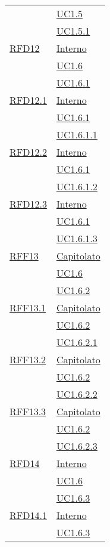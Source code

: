 \begin{longtable}{|>{\centering}m{5cm}|m{5cm}<{\centering}|}
& \hyperref[UC1.5]{UC1.5}\\
& \hyperref[UC1.5.1]{UC1.5.1}\\ \hline
\hyperlink{RFD12}{RFD12} & \hyperlink{Interno}{Interno}\\
& \hyperref[UC1.6]{UC1.6}\\
& \hyperref[UC1.6.1]{UC1.6.1}\\ \hline
\hyperlink{RFD12.1}{RFD12.1} & \hyperlink{Interno}{Interno}\\
& \hyperref[UC1.6.1]{UC1.6.1}\\
& \hyperref[UC1.6.1.1]{UC1.6.1.1}\\ \hline
\hyperlink{RFD12.2}{RFD12.2} & \hyperlink{Interno}{Interno}\\
& \hyperref[UC1.6.1]{UC1.6.1}\\
& \hyperref[UC1.6.1.2]{UC1.6.1.2}\\ \hline
\hyperlink{RFD12.3}{RFD12.3} & \hyperlink{Interno}{Interno}\\
& \hyperref[UC1.6.1]{UC1.6.1}\\
& \hyperref[UC1.6.1.3]{UC1.6.1.3}\\ \hline
\hyperlink{RFF13}{RFF13} & \hyperlink{Capitolato}{Capitolato}\\
& \hyperref[UC1.6]{UC1.6}\\
& \hyperref[UC1.6.2]{UC1.6.2}\\ \hline
\hyperlink{RFF13.1}{RFF13.1} & \hyperlink{Capitolato}{Capitolato}\\
& \hyperref[UC1.6.2]{UC1.6.2}\\
& \hyperref[UC1.6.2.1]{UC1.6.2.1}\\ \hline
\hyperlink{RFF13.2}{RFF13.2} & \hyperlink{Capitolato}{Capitolato}\\
& \hyperref[UC1.6.2]{UC1.6.2}\\
& \hyperref[UC1.6.2.2]{UC1.6.2.2}\\ \hline
\hyperlink{RFF13.3}{RFF13.3} & \hyperlink{Capitolato}{Capitolato}\\
& \hyperref[UC1.6.2]{UC1.6.2}\\
& \hyperref[UC1.6.2.3]{UC1.6.2.3}\\ \hline
\hyperlink{RFD14}{RFD14} & \hyperlink{Interno}{Interno}\\
& \hyperref[UC1.6]{UC1.6}\\
& \hyperref[UC1.6.3]{UC1.6.3}\\ \hline
\hyperlink{RFD14.1}{RFD14.1} & \hyperlink{Interno}{Interno}\\
& \hyperref[UC1.6.3]{UC1.6.3}\\

\end{longtable}
